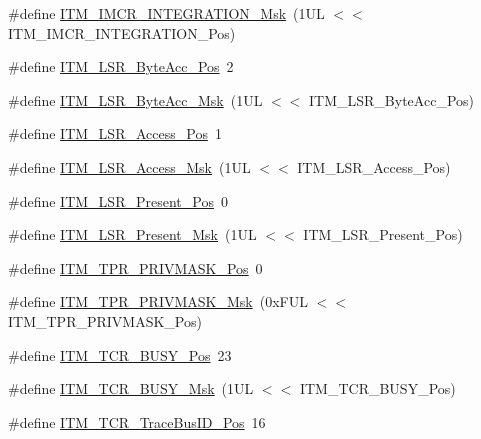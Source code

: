 \begin{DoxyCompactItemize}
\#define \mbox{\hyperlink{group___c_m_s_i_s___i_t_m_ga8838bd3dd04c1a6be97cd946364a3fd2}{I\+T\+M\+\_\+\+I\+M\+C\+R\+\_\+\+I\+N\+T\+E\+G\+R\+A\+T\+I\+O\+N\+\_\+\+Msk}}~(1\+U\+L $<$$<$ I\+T\+M\+\_\+\+I\+M\+C\+R\+\_\+\+I\+N\+T\+E\+G\+R\+A\+T\+I\+O\+N\+\_\+\+Pos)
\item 
\#define \mbox{\hyperlink{group___c_m_s_i_s___i_t_m_gabfae3e570edc8759597311ed6dfb478e}{I\+T\+M\+\_\+\+L\+S\+R\+\_\+\+Byte\+Acc\+\_\+\+Pos}}~2
\item 
\#define \mbox{\hyperlink{group___c_m_s_i_s___i_t_m_ga91f492b2891bb8b7eac5b58de7b220f4}{I\+T\+M\+\_\+\+L\+S\+R\+\_\+\+Byte\+Acc\+\_\+\+Msk}}~(1\+U\+L $<$$<$ I\+T\+M\+\_\+\+L\+S\+R\+\_\+\+Byte\+Acc\+\_\+\+Pos)
\item 
\#define \mbox{\hyperlink{group___c_m_s_i_s___i_t_m_ga144a49e12b83ad9809fdd2769094fdc0}{I\+T\+M\+\_\+\+L\+S\+R\+\_\+\+Access\+\_\+\+Pos}}~1
\item 
\#define \mbox{\hyperlink{group___c_m_s_i_s___i_t_m_gac8ae69f11c0311da226c0c8ec40b3d37}{I\+T\+M\+\_\+\+L\+S\+R\+\_\+\+Access\+\_\+\+Msk}}~(1\+U\+L $<$$<$ I\+T\+M\+\_\+\+L\+S\+R\+\_\+\+Access\+\_\+\+Pos)
\item 
\#define \mbox{\hyperlink{group___c_m_s_i_s___i_t_m_gaf5740689cf14564d3f3fd91299b6c88d}{I\+T\+M\+\_\+\+L\+S\+R\+\_\+\+Present\+\_\+\+Pos}}~0
\item 
\#define \mbox{\hyperlink{group___c_m_s_i_s___i_t_m_gaa5bc2a7f5f1d69ff819531f5508bb017}{I\+T\+M\+\_\+\+L\+S\+R\+\_\+\+Present\+\_\+\+Msk}}~(1\+U\+L $<$$<$ I\+T\+M\+\_\+\+L\+S\+R\+\_\+\+Present\+\_\+\+Pos)
\item 
\#define \mbox{\hyperlink{group___c_m_s_i_s___i_t_m_ga7abe5e590d1611599df87a1884a352e8}{I\+T\+M\+\_\+\+T\+P\+R\+\_\+\+P\+R\+I\+V\+M\+A\+S\+K\+\_\+\+Pos}}~0
\item 
\#define \mbox{\hyperlink{group___c_m_s_i_s___i_t_m_ga168e089d882df325a387aab3a802a46b}{I\+T\+M\+\_\+\+T\+P\+R\+\_\+\+P\+R\+I\+V\+M\+A\+S\+K\+\_\+\+Msk}}~(0x\+F\+U\+L $<$$<$ I\+T\+M\+\_\+\+T\+P\+R\+\_\+\+P\+R\+I\+V\+M\+A\+S\+K\+\_\+\+Pos)
\item 
\#define \mbox{\hyperlink{group___c_m_s_i_s___i_t_m_ga9174ad4a36052c377cef4e6aba2ed484}{I\+T\+M\+\_\+\+T\+C\+R\+\_\+\+B\+U\+S\+Y\+\_\+\+Pos}}~23
\item 
\#define \mbox{\hyperlink{group___c_m_s_i_s___i_t_m_ga43ad7cf33de12f2ef3a412d4f354c60f}{I\+T\+M\+\_\+\+T\+C\+R\+\_\+\+B\+U\+S\+Y\+\_\+\+Msk}}~(1\+U\+L $<$$<$ I\+T\+M\+\_\+\+T\+C\+R\+\_\+\+B\+U\+S\+Y\+\_\+\+Pos)
\item 
\#define \mbox{\hyperlink{group___c_m_s_i_s___i_t_m_gaca0281de867f33114aac0636f7ce65d3}{I\+T\+M\+\_\+\+T\+C\+R\+\_\+\+Trace\+Bus\+I\+D\+\_\+\+Pos}}~16

\end{DoxyCompactItemize}
